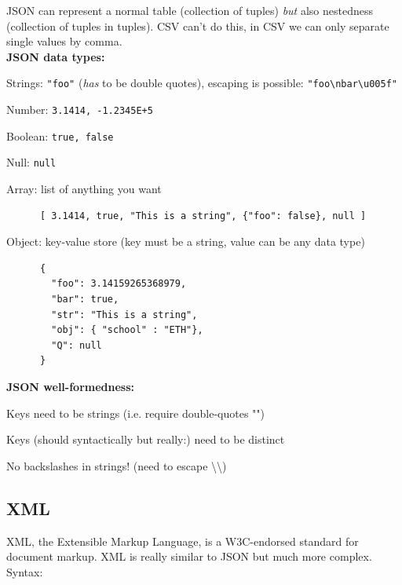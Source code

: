 \documentclass[11pt,oneside,a4paper]{article}
\begin{document}
JSON can represent a normal table (collection of tuples) \textit{but} also nestedness (collection of tuples in tuples). CSV can't do this, in CSV we can only separate single values by comma.\\
\textbf{JSON data types:}

\begin{compactitem}
	\item Strings: \verb|"foo"| (\textit{has} to be double quotes), escaping is possible: \verb|"foo\nbar\u005f"|
	\item Number: \verb|3.1414, -1.2345E+5|
	\item Boolean: \verb|true, false|
	\item Null: \verb|null|
	\item Array: list of anything you want
	\begin{verbatim}
	  [ 3.1414, true, "This is a string", {"foo": false}, null ]
	\end{verbatim}
	\item Object: key-value store (key must be a string, value can be any data type)
	\begin{verbatim}
	  {
	    "foo": 3.14159265368979,
	    "bar": true,
	    "str": "This is a string",
	    "obj": { "school" : "ETH"},
	    "Q": null
	  }
	\end{verbatim}	
\end{compactitem}

\textbf{JSON well-formedness:}

\begin{compactitem}
	\item Keys need to be strings (i.e. require double-quotes "")
	\item Keys (should syntactically but really:) need to be distinct
	\item No backslashes in strings! (need to escape \textbackslash\textbackslash)\\
\end{compactitem}

\subsection{XML}

XML, the Extensible Markup Language, is a W3C-endorsed standard for document markup. XML is really similar to JSON but much more complex. Syntax:
\end{document}
